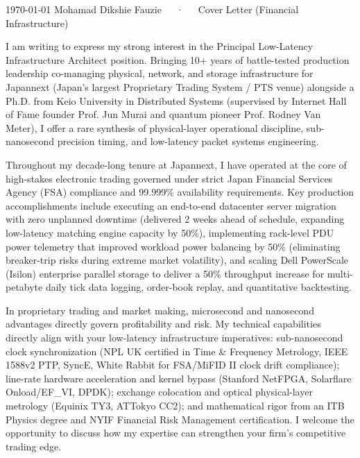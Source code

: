 \documentclass[11pt, a4paper]{awesome-cv}
\begin{document}
\makecvheader[R]

\makecvfooter
  {\today}
  {Mohamad Dikshie Fauzie~~~·~~~Cover Letter (Financial Infrastructure)}
  {}

\makelettertitle

\begin{cvletter}

I am writing to express my strong interest in the Principal Low-Latency Infrastructure Architect position. Bringing 10+ years of battle-tested production leadership co-managing physical, network, and storage infrastructure for Japannext (Japan's largest Proprietary Trading System / PTS venue) alongside a Ph.D. from Keio University in Distributed Systems (supervised by Internet Hall of Fame founder Prof. Jun Murai and quantum pioneer Prof. Rodney Van Meter), I offer a rare synthesis of physical-layer operational discipline, sub-nanosecond precision timing, and low-latency packet systems engineering.

Throughout my decade-long tenure at Japannext, I have operated at the core of high-stakes electronic trading governed under strict Japan Financial Services Agency (FSA) compliance and 99.999\% availability requirements. Key production accomplishments include executing an end-to-end datacenter server migration with zero unplanned downtime (delivered 2 weeks ahead of schedule, expanding low-latency matching engine capacity by 50\%), implementing rack-level PDU power telemetry that improved workload power balancing by 50\% (eliminating breaker-trip risks during extreme market volatility), and scaling Dell PowerScale (Isilon) enterprise parallel storage to deliver a 50\% throughput increase for multi-petabyte daily tick data logging, order-book replay, and quantitative backtesting.

In proprietary trading and market making, microsecond and nanosecond advantages directly govern profitability and risk. My technical capabilities directly align with your low-latency infrastructure imperatives: sub-nanosecond clock synchronization (NPL UK certified in Time \& Frequency Metrology, IEEE 1588v2 PTP, SyncE, White Rabbit for FSA/MiFID II clock drift compliance); line-rate hardware acceleration and kernel bypass (Stanford NetFPGA, Solarflare Onload/EF\_VI, DPDK); exchange colocation and optical physical-layer metrology (Equinix TY3, ATTokyo CC2); and mathematical rigor from an ITB Physics degree and NYIF Financial Risk Management certification. I welcome the opportunity to discuss how my expertise can strengthen your firm's competitive trading edge.

\end{cvletter}


\makeletterclosing
\end{document}
